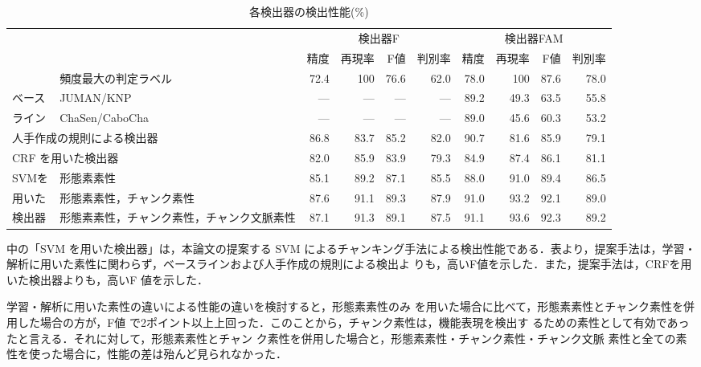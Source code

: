 \documentclass[japanese]{jnlp_1.2d}
\newcommand{\tabref}[1]{}
\begin{document}
\begin{table}[t]
  \caption{各検出器の検出性能(\%)}
  \label{tab:kekka_gaiyou}
  \begin{center}
    {\footnotesize
    \begin{tabular}{l|p{104pt}||rrr|r||rrr|r} 
\hline
      & & \multicolumn{4}{c||}{検出器F} & \multicolumn{4}{c}{検出器FAM} \\ \cline{3-6}\cline{7-10}
      & & 精度 & 再現率 & F値 & 判別率 & 精度 & 再現率 & F値 & 判別率  \\ \hline \hline
      & 頻度最大の判定ラベル & 72.4 & 100 & 76.6 & 62.0 & 78.0 & 100 & 87.6 & 78.0 \\
      ベース & JUMAN/KNP & --- & --- & --- & --- & 89.2 & 49.3 & 63.5 & 55.8 \\
      ライン & ChaSen/CaboCha & --- & --- & --- & --- & 89.0 & 45.6 & 60.3 & 53.2 \\ \hline
      \multicolumn{2}{l||}{人手作成の規則による検出器} & 86.8 & 83.7 & 85.2 & 82.0 & 90.7 & 81.6 & 85.9 & 79.1 \\
      \multicolumn{2}{l||}{CRF を用いた検出器} & 82.0 & 85.9 & 83.9 & 79.3 & 84.9 & 87.4 & 86.1 & 81.1 \\ \hline
      SVMを & 形態素素性 & 85.1 & 89.2 & 87.1 & 85.5 & 88.0 & 91.0 & 89.4 & 86.5 \\
      用いた & 形態素素性，チャンク素性 & 87.6 & 91.1 & 89.3 & 87.9 & 91.0 & 93.2 & 92.1 & 89.0 \\
      検出器 & 形態素素性，チャンク素性，チャンク文脈素性 & 87.1 & 91.3 & 89.1 & 87.5 & 91.1 & 93.6 & 92.3 & 89.2 \\ \hline
    \end{tabular}
    }
  \end{center}
\vspace*{-6pt}
\end{table}

\tabref{tab:kekka_gaiyou}中の「SVM を用いた検出器」は，本論文の提案する 
SVM によるチャンキング手法による検出性能である．表より，提案手法は，学習・
解析に用いた素性に関わらず，ベースラインおよび人手作成の規則による検出よ
りも，高いF値を示した．また，提案手法は，CRFを用いた検出器よりも，高いF 
値を示した．

学習・解析に用いた素性の違いによる性能の違いを検討すると，形態素素性のみ
を用いた場合に比べて，形態素素性とチャンク素性を併用した場合の方が，F値
で2ポイント以上上回った．このことから，チャンク素性は，機能表現を検出す
るための素性として有効であったと言える．それに対して，形態素素性とチャン
ク素性を併用した場合と，形態素素性・チャンク素性・チャンク文脈
素性と全ての素性を使った場合に，性能の差は殆んど見られなかった．
\end{document}
